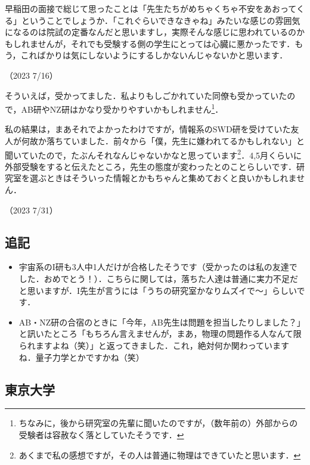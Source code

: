 \documentclass[a4paper,pdflatex,ja=standard]{bxjsarticle}
\begin{document}
早稲田の面接で総じて思ったことは「先生たちがめちゃくちゃ不安をあおってくる」ということでしょうか．「これぐらいできなきゃね」みたいな感じの雰囲気になるのは院試の定番なんだと思いますし，実際そんな感じに思われているのかもしれませんが，それでも受験する側の学生にとっては心臓に悪かったです．もう，こればかりは気にしないようにするしかないんじゃないかと思います．
\begin{flushright}
  （2023 7/16）  
\end{flushright}

そういえば，受かってました．私よりもしごかれていた同僚も受かっていたので，AB研やNZ研はかなり受かりやすいかもしれません\footnote{
  ちなみに，後から研究室の先輩に聞いたのですが，（数年前の）外部からの受験者は容赦なく落としていたそうです．
}．

私の結果は，まあそれでよかったわけですが，情報系のSWD研を受けていた友人が何故か落ちていました．前々から「僕，先生に嫌われてるかもしれない」と聞いていたので，たぶんそれなんじゃないかなと思っています\footnote{
  あくまで私の感想ですが，その人は普通に物理はできていたと思います．
}．4,5月くらいに外部受験をすると伝えたところ，先生の態度が変わったとのことらしいです．研究室を選ぶときはそういった情報とかもちゃんと集めておくと良いかもしれません．
\begin{flushright}
  （2023 7/31）
\end{flushright}

\subsection*{追記}

\begin{itemize}
  \item 
  宇宙系のI研も3人中1人だけが合格したそうです（受かったのは私の友達でした．おめでとう！）．こちらに関しては，落ちた人達は普通に実力不足だと思いますが．I先生が言うには「うちの研究室かなりムズイで～」らしいです．

  \item
  AB・NZ研の合宿のときに「今年，AB先生は問題を担当したりしました？」と訊いたところ「もちろん言えませんが，まあ，物理の問題作る人なんて限られますよね（笑）」と返ってきました．これ，絶対何か関わっていますね．量子力学とかですかね（笑）
\end{itemize}


\subsection{東京大学}
\end{document}
